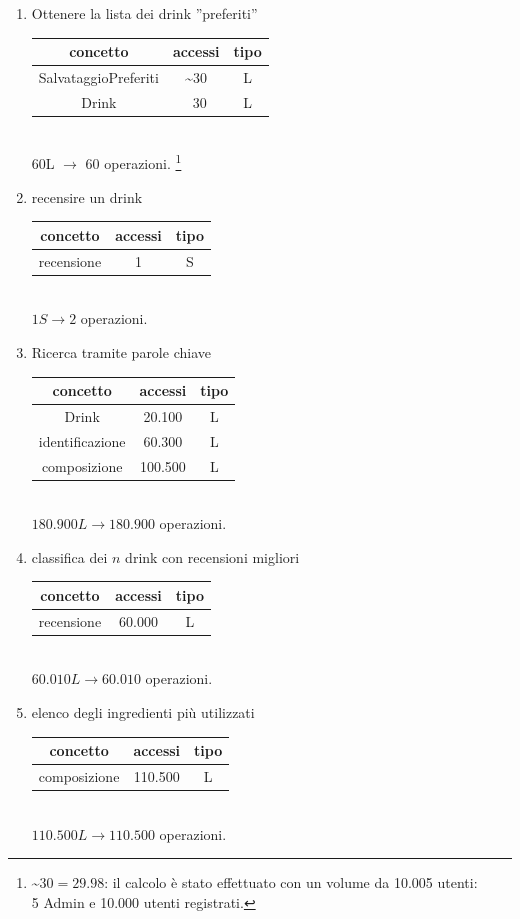 \documentclass[a4paper,12pt]{report}
\begin{document}
\begin{enumerate}
    \item Ottenere la lista dei drink ”preferiti”\\
    \begin{tabular}{c|c|c}
    concetto & accessi & tipo\\
    \hline
        SalvataggioPreferiti & \textasciitilde 30 & L\\
        Drink & ~30 & L\\
    \hline
    \end{tabular}
    \\60L $\to$ 60 operazioni.
\footnote{\textasciitilde $30=29.98$: il calcolo è stato effettuato con un volume da 10.005 utenti: \\5 Admin e 10.000 utenti registrati.}

    \item recensire un drink\\
    \begin{tabular}{c|c|c}
    concetto & accessi & tipo\\
    \hline
        recensione & 1 & S\\
    \hline
    \end{tabular}
    \\ $1S\to2$ operazioni.

    \item Ricerca tramite parole chiave\\
    \begin{tabular}{c|c|c}
    concetto & accessi & tipo\\
    \hline
        Drink & 20.100 & L\\
        identificazione & 60.300 & L\\
        composizione & 100.500 & L\\
    \hline
    \end{tabular}
    \\ $180.900L\to180.900$ operazioni.

    \item classifica dei $n$ drink con recensioni migliori\\
        \begin{tabular}{c|c|c}
    concetto & accessi & tipo\\
    \hline
        recensione & 60.000 & L\\
    \hline
    \end{tabular}
    \\ $60.010L\to60.010$ operazioni.

    \item elenco degli ingredienti più utilizzati\\
    \begin{tabular}{c|c|c}
    concetto & accessi & tipo\\
    \hline
        composizione & 110.500 & L\\
    \hline
    \end{tabular}
    \\ $110.500L\to110.500$ operazioni.


\end{enumerate}
\end{document}
